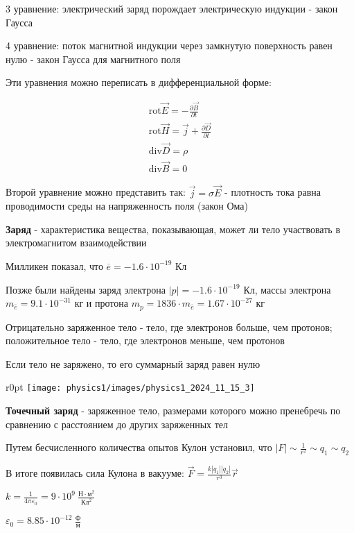 \documentclass[12pt]{article}
\begin{document}
    3 уравнение: электрический заряд порождает электрическую индукции - закон Гаусса

    4 уравнение: поток магнитной индукции через замкнутую поверхность равен нулю - закон Гаусса для магнитного поля

    Эти уравнения можно переписать в дифференциальной форме:

    \begin{tcolorbox}[colframe=green!25, colback=green!10]
        \begin{gather*}
            \mathrm{rot} \vec{E} = -\frac{\partial \vec{B}}{\partial t}\\
            \mathrm{rot} \vec{H} = \vec{j} + \frac{\partial \vec{D}}{\partial t}\\
            \mathrm{div} \vec{D} = \rho\\
            \mathrm{div} \vec{B} = 0
        \end{gather*}
    \end{tcolorbox}

    Второй уравнение можно представить так: $\vec{j} = \sigma \vec{E}$ - 
    плотность тока равна проводимости среды на напряженность поля (закон Ома)

    \textbf{Заряд} - характеристика вещества, показывающая, может ли тело участвовать в электромагнитом взаимодействии

    Милликен показал, что $\overline{e} = -1.6 \cdot 10^{-19}$ Кл 

    Позже были найдены заряд электрона $|p| = -1.6 \cdot 10^{-19}$ Кл, массы электрона $m_{\overline{e}} = 9.1 \cdot 10^{-31}$ кг и протона $m_p = 1836 \cdot m_{\overline{e}} = 1.67 \cdot 10^{-27}$ кг

    Отрицательно заряженное тело - тело, где электронов больше, чем протонов; положительное тело - тело, где электронов меньше, чем протонов

    Если тело не заряжено, то его суммарный заряд равен нулю

    \smallvspace

    \begin{minipage}{\textwidth}
        \begin{wrapfigure}{r}{0pt}
            \texttt{[image: physics1/images/physics1\_2024\_11\_15\_3]}
        \end{wrapfigure}

        \textbf{Точечный заряд} - заряженное тело, размерами которого можно пренебречь по сравнению с расстоянием до других заряженных тел

        Путем бесчисленного количества опытов Кулон установил, что $|F| \sim \frac{1}{r^2} \sim q_1 \sim q_2$

        В итоге появилась сила Кулона в вакууме: 
        $\vec{F} = \frac{k|q_1| |q_2|}{r^3} \vec{r}$

        $k = \frac{1}{4\pi \varepsilon_0} = 9 \cdot 10^9 \ \frac{\text{Н} \cdot \text{м}^2}{\text{Кл}^2}$

        $\varepsilon_0 = 8.85 \cdot 10^{-12} \ \frac{\text{Ф}}{\text{м}}$
    \end{minipage}
    
\end{document}
